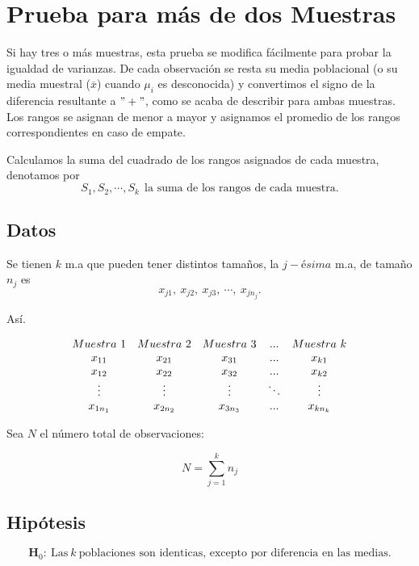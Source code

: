\documentclass[
  a4paper,
  oneside,
  openany]{book}
\begin{document}
\hypertarget{prueba-para-muxe1s-de-dos-muestras}{%
\chapter{Prueba para más de dos Muestras}\label{prueba-para-muxe1s-de-dos-muestras}}

Si hay tres o más muestras, esta prueba se modifica fácilmente para probar la igualdad de varianzas. De cada observación se resta su media poblacional (o su media muestral (\(\overline{x}\)) cuando \(\mu_{i}\) es desconocida) y convertimos el signo de la diferencia resultante a \("+"\), como se acaba de describir para ambas muestras.
Los rangos se asignan de menor a mayor y asignamos el promedio de los rangos correspondientes en caso de empate.

Calculamos la suma del cuadrado de los rangos asignados de cada muestra, denotamos por \[S_{1},S_{2},\cdots,S_{k} \  \ \mbox{la suma de los rangos de cada muestra.}\]

\hypertarget{datos-9}{%
\section{Datos}\label{datos-9}}

Se tienen \(k\) m.a que pueden tener distintos tamaños, la \(j-ésima\) m.a, de tamaño \(n_j\) es \[x_{j1},\ x_{j2},\ x_{j3},\ \cdots, \ x_{jn_j}.\]

Así.

\[
\begin{array}{c c c c c} 
Muestra \ 1&Muestra\ 2&Muestra\ 3&...& Muestra\ k \\
x_{11}&x_{21}&x_{31}&...&x_{k1}\\
x_{12}&x_{22}&x_{32}&...&x_{k2}\\
\vdots&\vdots&\vdots&\ddots&\vdots\\
x_{1n_1}&x_{2n_2}&x_{3n_3}&...&x_{kn_k}\\
\end{array}
\]

Sea \(N\) el número total de observaciones:

\[N=\sum_{j=1}^k n_j\]

\hypertarget{hipuxf3tesis-8}{%
\section{Hipótesis}\label{hipuxf3tesis-8}}

\[\textbf{H}_0: \ \mbox{Las} \  k  \ \mbox{poblaciones son identicas, excepto por diferencia en las medias.}\]
\end{document}
